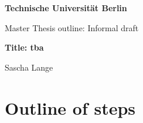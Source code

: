 \documentclass[a4paper, 11pt]{article}
\newcommand{\blatt}{}
\begin{document}
 
	
	\rhead[ \leftmark   ]{\textbf{}}
	\chead[\leftmark   ]{\leftmark{}}
	\lhead[\textbf{}]{\blatt}
	
	
	\thispagestyle{empty}
	\begin{center}
		
		\vspace*{1.4cm}
		{\LARGE \textbf{Technische Universität Berlin}}
		
		\vspace{0.5cm}
		
		{\large Master Thesis outline: Informal draft\\[1mm]}

		
		
		\vspace{1.0cm}
		{\LARGE \textbf{Title: tba}}\\
		\vspace*{1.0cm}
		
	
		Sascha Lange%
		
		
		
	\end{center}
	
	\renewcommand{\labelenumi}{\alph{enumi})}
	\renewcommand{\labelenumii}{(\roman{enumii})}
	\renewcommand{\labelenumiii}{\arabic{enumiii}.}
	\renewcommand{\contentsname}{Table of Contents}
	



	\newpage
	\newtheorem{Cor}{Corollary}
	\newtheorem{Theorem}{Theorem}
	\newtheorem{Def}{Definition}
	\newtheorem{Prop}{Proposition}
	\newtheorem{Lemma}{Lemma}
	\section*{Outline of steps}
\end{document}
